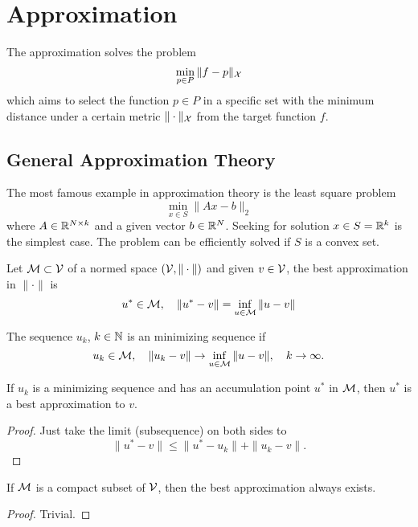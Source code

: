 \chapter{Approximation}
\label{Ch: 4-App}
The approximation solves the problem 
$$\min_{p\in P}\|f - p\|_{\mathcal X}$$
which aims to select the function $p\in P$ in a specific set with the minimum distance under a certain metric $\|\cdot\|_{\mathcal X}$ from the target function $f$. 
\section{General Approximation Theory}
\label{Sec: 4-Gen-App-The}
The most famous example in approximation theory is the least square problem 
$$\min_{x\in S} \|Ax - b\|_2$$
where $A\in\mathbb R^{N\times k}$ and a given vector $b\in \mathbb R^N$. Seeking for solution $x\in S = \mathbb R^k$ is the simplest case. The problem can be efficiently solved if $S$ is a convex set. 
\begin{definition}
    Let $\mathcal M\subset \mathcal V$ of a normed space $(\mathcal V, \|\cdot\|)$ and given $v\in\mathcal V$, the best approximation in $\|\cdot\|$ is 
    $$u^{\ast}\in\mathcal M,\quad \|u^{\ast} - v\| = \inf_{u\in\mathcal M} \|u - v\|$$
\end{definition}
\begin{definition}
    The sequence $u_k$, $k\in\mathbb N$ is an minimizing sequence if 
    \begin{equation}
        u_k \in\mathcal M,\quad \|u_k - v\|\to \inf_{u\in\mathcal M}\|u - v\|,\quad k\to\infty.
    \end{equation}
\end{definition}
\begin{theorem}
\label{Thm: 4-Exi-Bes-App}
If $u_k$ is a minimizing sequence and has an accumulation point $u^{\ast}$ in $\mathcal M$, then  $u^{\ast}$ is a best approximation to $v$.
\end{theorem}
\begin{proof}
    Just take the limit (subsequence) on both sides to 
    \begin{equation}
        \|u^{\ast} - v\| \le \|u^{\ast} - u_k\| + \|u_k - v\|.
    \end{equation}
\end{proof}
\begin{theorem}
\label{Thm: 4-Com-Exi}
    If $\mathcal M$ is a compact subset of $\mathcal V$, then the best approximation always exists.
\end{theorem}
\begin{proof}
    Trivial.
\end{proof}

